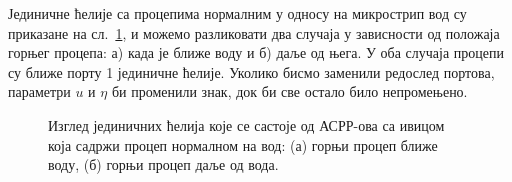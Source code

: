Јединичне ћелије са процепима нормалним у односу на микрострип вод су приказане на сл.~\ref{norm_gep}, и можемо разликовати два случаја у зависности од положаја горњег процепа: а) када је ближе воду и б) даље од њега. У оба случаја процепи су ближе порту 1 јединичне ћелије. Уколико бисмо заменили редослед портова, параметри $u$ и $\eta$ би променили знак, док би све остало било непромењено.
\begin{figure}[!t]
\hfill
{}
\caption{Изглед јединичних ћелија које се састоје од АСРР-ова са ивицом која садржи процеп нормалном на вод: (а) горњи процеп ближе воду, (б) горњи процеп даље од вода.}
\label{norm_gep}
\end{figure}


